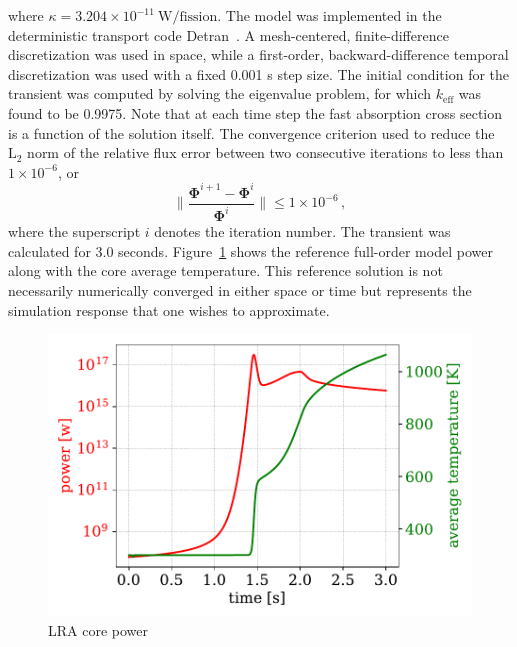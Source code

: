 \documentclass[review,number,sort&compress,12pt]{elsarticle}
\begin{document}
where $\kappa = 3.204\times 10^{-11}~ \text{W/fission}$.
The model was implemented in the deterministic transport code Detran~\cite{roberts2014advanced}.
A mesh-centered, finite-difference discretization was used in space, while a first-order, backward-difference temporal discretization was used with a fixed 0.001 s step size.  
The initial condition for the transient was computed by solving the eigenvalue problem, for which $k_{\text{eff}}$ was found to be 0.9975.
Note that at each time step the fast absorption cross section is a function of the solution itself.
The convergence criterion used to reduce the $\text{L}_2$ norm  of the relative flux error between two consecutive iterations to less than $1\times 10^{-6}$, or
\begin{equation}
\|\frac{\mathbf{\Phi}^{i+1} - \mathbf{\Phi}^{i}} {\mathbf{\Phi}^i}\| \le  1\times 10^{-6} \, ,
\label{eq:convergance criteria} 
\end{equation}
where the superscript $i$ denotes the iteration number.
The transient was calculated for 3.0 seconds.
Figure~\ref{fig:lra fom power} shows the reference full-order model power along with the core average temperature.
This reference solution is not necessarily numerically converged in either space or time but represents the simulation response that one wishes to approximate.
\begin{figure}[h!]
	\includegraphics[width=1.0\linewidth]{../figures/LRA_fom_power_temperature.pdf}
	\caption{LRA core power}
	\label{fig:lra fom power}
\end{figure}

\end{document}
